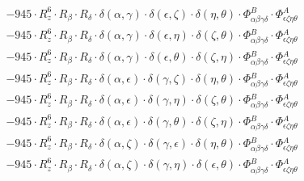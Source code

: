 \documentclass{article}
\begin{document}
\begin{equation}
\begin{array}{c}
 \\[0.2em] 		 - 945 \cdot R_{z}^{6} \cdot R_{\beta{}} \cdot R_{\delta{}} \cdot \delta{}\left(\alpha{}, \gamma{}\right) \cdot \delta{}\left(\epsilon{}, \zeta{}\right) \cdot \delta{}\left(\eta{}, \theta{}\right) \cdot \Phi{}^{B}_{\alpha{}\beta{}\gamma{}\delta{}} \cdot \Phi{}^{A}_{\epsilon{}\zeta{}\eta{}\theta{}} 
 \\[0.2em] 		 - 945 \cdot R_{z}^{6} \cdot R_{\beta{}} \cdot R_{\delta{}} \cdot \delta{}\left(\alpha{}, \gamma{}\right) \cdot \delta{}\left(\epsilon{}, \eta{}\right) \cdot \delta{}\left(\zeta{}, \theta{}\right) \cdot \Phi{}^{B}_{\alpha{}\beta{}\gamma{}\delta{}} \cdot \Phi{}^{A}_{\epsilon{}\zeta{}\eta{}\theta{}} 
 \\[0.2em] 		 - 945 \cdot R_{z}^{6} \cdot R_{\beta{}} \cdot R_{\delta{}} \cdot \delta{}\left(\alpha{}, \gamma{}\right) \cdot \delta{}\left(\epsilon{}, \theta{}\right) \cdot \delta{}\left(\zeta{}, \eta{}\right) \cdot \Phi{}^{B}_{\alpha{}\beta{}\gamma{}\delta{}} \cdot \Phi{}^{A}_{\epsilon{}\zeta{}\eta{}\theta{}} 
 \\[0.2em] 		 - 945 \cdot R_{z}^{6} \cdot R_{\beta{}} \cdot R_{\delta{}} \cdot \delta{}\left(\alpha{}, \epsilon{}\right) \cdot \delta{}\left(\gamma{}, \zeta{}\right) \cdot \delta{}\left(\eta{}, \theta{}\right) \cdot \Phi{}^{B}_{\alpha{}\beta{}\gamma{}\delta{}} \cdot \Phi{}^{A}_{\epsilon{}\zeta{}\eta{}\theta{}} 
 \\[0.2em] 		 - 945 \cdot R_{z}^{6} \cdot R_{\beta{}} \cdot R_{\delta{}} \cdot \delta{}\left(\alpha{}, \epsilon{}\right) \cdot \delta{}\left(\gamma{}, \eta{}\right) \cdot \delta{}\left(\zeta{}, \theta{}\right) \cdot \Phi{}^{B}_{\alpha{}\beta{}\gamma{}\delta{}} \cdot \Phi{}^{A}_{\epsilon{}\zeta{}\eta{}\theta{}} 
 \\[0.2em] 		 - 945 \cdot R_{z}^{6} \cdot R_{\beta{}} \cdot R_{\delta{}} \cdot \delta{}\left(\alpha{}, \epsilon{}\right) \cdot \delta{}\left(\gamma{}, \theta{}\right) \cdot \delta{}\left(\zeta{}, \eta{}\right) \cdot \Phi{}^{B}_{\alpha{}\beta{}\gamma{}\delta{}} \cdot \Phi{}^{A}_{\epsilon{}\zeta{}\eta{}\theta{}} 
 \\[0.2em] 		 - 945 \cdot R_{z}^{6} \cdot R_{\beta{}} \cdot R_{\delta{}} \cdot \delta{}\left(\alpha{}, \zeta{}\right) \cdot \delta{}\left(\gamma{}, \epsilon{}\right) \cdot \delta{}\left(\eta{}, \theta{}\right) \cdot \Phi{}^{B}_{\alpha{}\beta{}\gamma{}\delta{}} \cdot \Phi{}^{A}_{\epsilon{}\zeta{}\eta{}\theta{}} 
 \\[0.2em] 		 - 945 \cdot R_{z}^{6} \cdot R_{\beta{}} \cdot R_{\delta{}} \cdot \delta{}\left(\alpha{}, \zeta{}\right) \cdot \delta{}\left(\gamma{}, \eta{}\right) \cdot \delta{}\left(\epsilon{}, \theta{}\right) \cdot \Phi{}^{B}_{\alpha{}\beta{}\gamma{}\delta{}} \cdot \Phi{}^{A}_{\epsilon{}\zeta{}\eta{}\theta{}} 

\end{array}
\end{equation}
\end{document}
